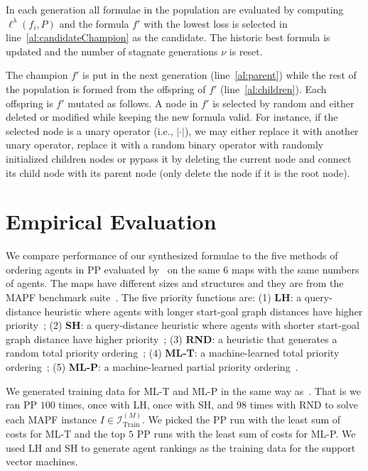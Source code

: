 \documentclass[letterpaper]{article}
\begin{document}
In each generation all formulae in the population are evaluated by computing $ \ell^{\lambda}(f_i, P) $ and the formula $ f' $ with the lowest loss is selected in line~\ref{al:candidateChampion} as the candidate. The historic best formula is updated and the number of stagnate generations $ \nu $ is reset.

The champion $ f' $ is put in the next generation (line~\ref{al:parent}) while the rest of the population is formed from the offspring of $ f' $ (line~\ref{al:children}). Each offspring is $ f' $ mutated as follows. A node in $ f' $ is selected by random and either deleted or modified while keeping the new formula valid. For instance, if the selected node is a unary operator (i.e., $ |\cdot| $), we may either replace it with another unary operator, replace it with a random binary operator with randomly initialized children nodes or pypass it by deleting the current node and connect its child node with its parent node (only delete the node if it is the root node).

\section{Empirical Evaluation}
\label{sec:empiricalEvaluation}

We compare performance of our synthesized formulae to the five methods of ordering agents in PP evaluated by~\citet{zhang2022learning} on the same $ 6 $ maps with the same numbers of agents. The maps have different sizes and structures and they are from the MAPF benchmark suite~\citep{stern2019multi}. The five priority functions are: (1) \textbf{LH}: a query-distance heuristic where agents with longer start-goal graph distances have higher priority~\citep{van2005prioritized}; (2) \textbf{SH}: a query-distance heuristic where agents with shorter start-goal graph distance have higher priority~\citep{ma2019searching}; (3) \textbf{RND}: a heuristic that generates a random total priority ordering~\citep{bennewitz2002finding}; (4) \textbf{ML-T}: a machine-learned total priority ordering~\citep{zhang2022learning}; (5) \textbf{ML-P}: a machine-learned partial priority ordering~\citep{zhang2022learning}.

We generated training data for ML-T and ML-P in the same way as~\citet{zhang2022learning}. That is we ran PP $ 100 $ times, once with LH, once with SH, and $ 98 $ times with RND to solve each MAPF instance $ I \in \mathcal{I}^{(M)}_{\text{Train}} $. We picked the PP run with the least sum of costs for ML-T and the top $ 5 $ PP runs with the least sum of costs for ML-P. We used LH and SH to generate agent rankings as the training data for the support vector machines.
\end{document}
